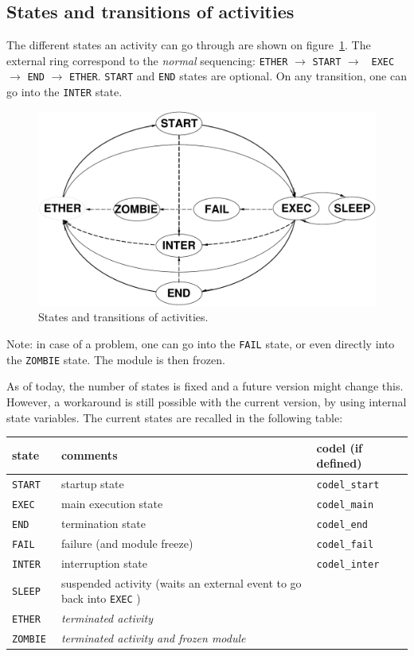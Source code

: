 \subsection{States and transitions of activities}

The   different  states   an  activity can   go   through  are  shown  on
figure~\ref{fig|states}. The external ring correspond to the {\em normal}
sequencing: {\tt  ETHER} $\rightarrow$   {\tt START} $\rightarrow$   {\tt
EXEC} $\rightarrow$ {\tt END}  $\rightarrow$ {\tt ETHER}. {\tt START} and
{\tt END}  states are optional.   On any transition, one  can go into the
{\tt INTER} state.

\begin{figure}[htbp]
\centering
\includegraphics[width=0.8\hsize]{fig/activity-states}
\caption{States and transitions of activities.}
\label{fig|states}
\end{figure}

Note: in case of a problem, one can go into the {\tt FAIL} state, or even
directly into the {\tt ZOMBIE} state. The module is then frozen.

As of today, the  number of states is fixed  and  a future version  might
change this.  However, a workaround  is  still possible with the  current
version, by using internal   state   variables. The current  states   are
recalled in the following table:

\bigbreak

{\small\begin{tabularx}{0.8\linewidth}{|l||X|l|}
\hline
state 	& comments 	& codel (if defined)	  \\
\hline
\tt START  & startup state 
		& \tt codel\_start 	\\
\tt EXEC   & main execution state & \tt codel\_main  \\
\tt END    & termination state 	& \tt codel\_end \\
\tt FAIL   & failure (and module freeze) \em 
					& \tt codel\_fail \\
\hline
\tt INTER  & interruption state 
					& \tt codel\_inter  \\
\hline
\tt SLEEP     	&  suspended activity (waits an external event to go back
into  {\tt EXEC} ) & \\
\tt ETHER    	& \em terminated activity  & \\
\tt ZOMBIE   	& \em terminated activity and frozen module & \\
\hline
\end{tabularx}}

